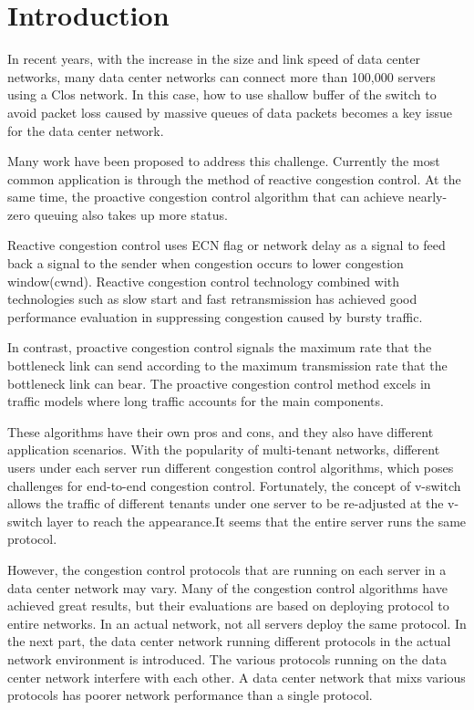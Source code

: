 \documentclass[conference]{IEEEtran}
\begin{document}
\section{Introduction}

In recent years, with the increase in the size and link speed of data center networks, many data center networks can connect more than 100,000 servers using a Clos network\cite{Arjun2016Jupiter}. In this case, how to use shallow buffer of the switch to avoid packet loss caused by massive queues of data packets becomes a key issue for the data center network\cite{Al2008A}\cite{GREENBERG2009VL2}.

\indent Many work have been proposed to address this challenge. Currently the most common application is through the method of reactive congestion control. At the same time, the proactive congestion control algorithm that can achieve nearly-zero queuing also takes up more status.

\indent Reactive congestion control uses ECN flag\cite{Alizadeh2010Data}\cite{Alizadeh2012Less}\cite{wu2010ictcp} \cite{zhu2015congestion}or network delay\cite{lee2015accurate}\cite{mittal2015timely}\cite{perry2015fastpass} as a signal to feed back a signal to the sender when congestion occurs to lower congestion window(cwnd). Reactive congestion control technology combined with technologies such as slow start and fast retransmission\cite{stevens1997tcp} has achieved good performance evaluation in suppressing congestion caused by bursty traffic\cite{benson2010network}\cite{Alizadeh2010Data}.

\indent In contrast, proactive congestion control signals the maximum rate that the bottleneck link can send according to the maximum transmission rate that the bottleneck link can bear\cite{huang2018congestion}. The proactive congestion control method excels in traffic models where long traffic accounts for the main components.

\indent These algorithms have their own pros and cons, and they also have different application scenarios. With the popularity of multi-tenant networks, different users under each server run different congestion control algorithms, which poses challenges for end-to-end congestion control. Fortunately, the concept of v-switch allows the traffic of different tenants under one server to be re-adjusted at the v-switch layer to reach the appearance.It seems that the entire server runs the same protocol\cite{He2016AC}.

\indent However, the congestion control protocols that are running on each server in a data center network may vary. Many of the congestion control algorithms have achieved great results, but their evaluations are based on deploying protocol to entire networks. In an actual network, not all servers deploy the same protocol. In the next part, the data center network running different protocols in the actual network environment is introduced. The various protocols running on the data center network interfere with each other. A data center network that mixs various protocols has poorer network performance than a single protocol.
\end{document}

